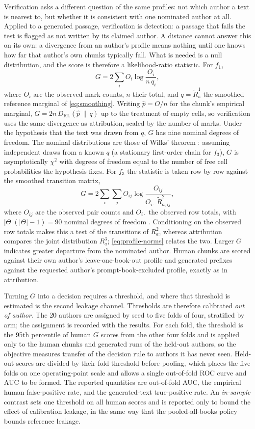 \documentclass[11pt]{article}
\newcommand{\fOne}{\ensuremath{f_1}\xspace}
\newcommand{\fThree}{\ensuremath{f_3}\xspace}
\newcommand{\KL}{D_{\mathrm{KL}}}
\begin{document}
Verification asks a different question of the same profiles: not which
author a text is nearest to, but whether it is consistent with one
nominated author at all.  Applied to a generated passage, verification is
detection: a passage that fails the test is flagged as not written by its
claimed author.  A distance cannot answer this on its own: a
divergence from an author's profile means nothing until one knows how far
that author's own chunks typically fall.  What is needed is a null
distribution, and the score is therefore a likelihood-ratio statistic.  For
\fOne,
\[
  G = 2 \sum_{i} O_i \log\frac{O_i}{n\,q_i},
\]
where \(O_i\) are the observed mark counts, \(n\) their total, and
\(q = \widetilde R^{1}_a\) the smoothed reference marginal of
\eqref{eq:smoothing}.  Writing \(\widehat p = O/n\) for the chunk's
empirical marginal, \(G = 2n\,\KL(\widehat p \,\|\, q)\) up to the
treatment of empty cells, so verification uses the same divergence as
attribution, scaled by the number of marks.  Under the hypothesis that the
text was drawn from \(q\), \(G\) has nine nominal degrees of freedom.
The nominal distributions are those of Wilks' theorem \cite{wilks1938}:
assuming independent draws from a known \(q\) (a stationary first-order
chain for \fThree), \(G\) is asymptotically \(\chi^2\) with degrees of
freedom equal to the number of free cell probabilities the hypothesis
fixes.  For \fThree the
statistic is taken row by row against the smoothed transition matrix,
\[
  G = 2 \sum_{i}\sum_{j} O_{ij}
      \log\frac{O_{ij}}{O_{i\cdot}\,\widetilde R^{2}_{a,ij}} ,
\]
where \(O_{ij}\) are the observed pair counts and \(O_{i\cdot}\) the
observed row totals, with \(|\Theta|(|\Theta|-1) = 90\) nominal degrees of
freedom \cite{anderson1957}.  Conditioning on the observed row totals makes
this a test of the transitions of \(R^{2}_a\), whereas attribution compares
the joint distribution \(R^{3}_a\); \eqref{eq:profile-norms} relates the
two.  Larger \(G\) indicates greater departure from the nominated
author.  Human chunks are scored against their own
author's leave-one-book-out profile and generated prefixes against the
requested author's prompt-book-excluded profile, exactly as in attribution.

Turning \(G\) into a decision requires a threshold, and where that
threshold is estimated is the second leakage channel.  Thresholds are
therefore calibrated \emph{out of author}.  The 20 authors are assigned by
seed to five folds of four, stratified by arm; the assignment is recorded
with the results.  For each fold, the threshold is the 95th percentile of
human \(G\) scores from the other four folds and is applied only to the
human chunks and generated runs of the held-out authors, so the objective
measures transfer of the decision rule to authors it has never seen.
Held-out scores are divided by their fold threshold before pooling, which
places the five folds on one operating-point scale and allows a single
out-of-fold ROC curve and AUC to be formed.  The reported quantities are
out-of-fold AUC, the empirical human false-positive rate, and the
generated-text true-positive rate.  An \emph{in-sample} contrast sets one
threshold on all human scores and is reported only to bound the effect of
calibration leakage, in the same way that the pooled-all-books policy
bounds reference leakage.
\end{document}

